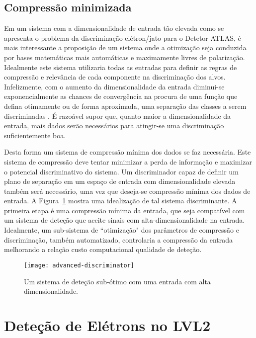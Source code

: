 \subsection{Compressão minimizada}

Em um sistema com a dimensionalidade de entrada tão elevada como se apresenta
o problema da discriminação elétron/jato para o Detetor ATLAS, é mais
interessante a proposição de um sistema onde a otimização seja conduzida por
bases matemáticas mais automáticas e maximamente livres de
polarização. Idealmente este sistema utilizaria todas as entradas para definir
as regras de compressão e relevância de cada componente na discriminação dos
alvos. Infelizmente, com o aumento da dimensionalidade da entrada diminui-se
exponencialmente as chances de convergência na procura de uma função que
defina otimamente ou de forma aproximada, uma separação das classes a serem
discriminadas \cite{haykin}. É razoável supor que, quanto maior a
dimensionalidade da entrada, mais dados serão necessários para atingir-se uma
discriminação suficientemente boa. 

Desta forma um sistema de compressão mínima dos dados se faz necessária. Este
sistema de compressão deve tentar minimizar a perda de informação e maximizar
o potencial discriminativo do sistema. Um discriminador capaz de definir um
plano de separação em um espaço de entrada com dimensionalidade elevada também
será necessário, uma vez que deseja-se compressão mínima dos dados de
entrada. A Figura~\ref{fig:advanced-discriminator} mostra uma idealização de
tal sistema discriminante. A primeira etapa é uma compressão mínima da
entrada, que seja compatível com um sistema de deteção que aceite sinais com
alta-dimensionalidade na entrada. Idealmente, um sub-sistema de ``otimização"
dos parâmetros de compressão e discriminação, também automatizado, controlaria
a compressão da entrada melhorando a relação custo computacional 
qualidade de deteção.

\begin{figure}
\begin{center}
\texttt{[image: advanced-discriminator]}
\end{center}
\caption{Um sistema  de deteção sub-ótimo com uma entrada com alta
dimensionalidade.}
\label{fig:advanced-discriminator}
\end{figure}

\section{Deteção de Elétrons no LVL2}
\label{sec:lvl2-detect-electron}

